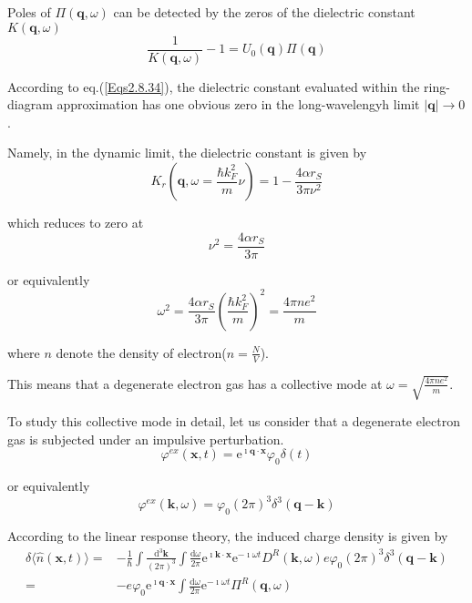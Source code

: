 Poles of $\Pi(\mathbf{q},\omega)$ can be detected by the zeros of the dielectric constant $K(\mathbf{q},\omega)$
\begin{equation} \label{Eqs3.2.1}
\frac{1}{K(\mathbf{q},\omega)} - 1 = U_0(\mathbf{q}) \Pi(\mathbf{q})
\end{equation}

According to eq.(\ref{Eqs2.8.34}), the dielectric constant evaluated within the ring-diagram approximation has one obvious zero in the long-wavelengyh limit $|\mathbf{q}| \rightarrow 0$.

Namely, in the dynamic limit, the dielectric constant is given by
\begin{equation*} \tag{2.8.34}
K_r(\mathbf{q},\omega = \frac{\hbar k_F^2}{m}\nu) = 1- \frac{4\alpha r_S}{3\pi \nu^2}
\end{equation*}

which reduces to zero at
\[\nu^2 = \frac{4\alpha r_S}{3\pi}\]

or equivalently
\begin{equation} \label{Eqs3.2.2}
\omega^2 = \frac{4\alpha r_S}{3\pi} \left( \frac{\hbar k_F^2}{m} \right)^2 = \frac{4\pi n e^2}{m}
\end{equation}

where $n$ denote the density of electron($n = \frac{N}{V}$).

This means that a degenerate electron gas has a collective mode at $\omega = \sqrt{\frac{4\pi n e^2}{m}}$.

To study this collective mode in detail, let us consider that a degenerate electron gas is subjected under an impulsive perturbation.
\begin{equation} \label{Eqs3.2.3}
\varphi^{ex}(\mathbf{x},t) = \mathrm{e}^{\imath \mathbf{q} \cdot \mathbf{x}} \varphi_0 \delta(t)
\end{equation}

or equivalently
\begin{equation*} \label{Eqs3.2.3'} \tag{3.2.3'}
\varphi^{ex}(\mathbf{k},\omega) = \varphi_0 (2\pi)^3 \delta^3(\mathbf{q}-\mathbf{k})
\end{equation*}

According to the linear response theory, the induced charge density is given by
\begin{equation} \label{Eqs3.2.4} \begin{split}
\delta \langle \hat{n}(\mathbf{x},t) \rangle =&-\frac{1}{\hbar} \int \frac{\mathrm{d}^3 \mathbf{k}}{(2\pi)^3} \int \frac{\mathrm{d}\omega}{2\pi} \mathrm{e}^{\imath \mathbf{k} \cdot \mathbf{x}} \mathrm{e}^{-\imath \omega t} D^R(\mathbf{k},\omega) e \varphi_0 (2\pi)^3 \delta^3(\mathbf{q}-\mathbf{k})\\
=& - e \varphi_0 \mathrm{e}^{\imath \mathbf{q} \cdot \mathbf{x}} \int \frac{\mathrm{d}\omega}{2\pi}\mathrm{e}^{-\imath \omega t} \Pi^R(\mathbf{q},\omega)
\end{split}\end{equation}

